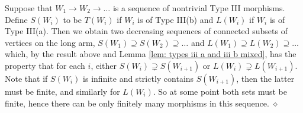 \documentclass{article}
\newcommand{\maps}{:}
\newenvironment{proof}{\vspace*{2ex}\noindent {\em Proof:}
}{\hfill $\diamond$ \\[2ex]}
\newcommand{\hilight}[1]{\colorbox{yellow}{#1}}
\begin{document}
\begin{proof}
Suppose that $W_1 \to W_2 \to \ldots$ is a sequence of nontrivial Type III morphisms. Define $S(W_i)$ to be $T(W_i)$ if $W_i$ is of Type III(b) and $L(W_i)$ if $W_i$ is of Type III(a). Then we obtain two decreasing sequences of connected subsets of vertices on the long arm, $S(W_1) \supseteq S(W_2) \supseteq \ldots$ and $L(W_1) \supseteq L(W_2) \supseteq \ldots$ which, by the result above and Lemma \ref{lem: types iii a and iii b mixed}, has the property that for each $i$, either $S(W_i) \supsetneq S(W_{i + 1})$ or $L(W_i) \supsetneq L(W_{i + 1})$. Note that if $S(W_i)$ is infinite and strictly contains $S(W_{i + 1})$, then the latter must be finite, and similarly for $L(W_i)$. So at some point both sets must be finite, hence there can be only finitely many morphisms in this sequence. 
\end{proof}




\end{document}
